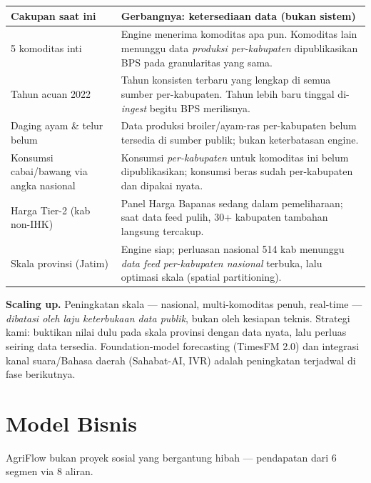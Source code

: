 \documentclass[11pt,a4paper]{article}
\begin{document}
\begin{center}
\begin{longtable}{p{6.2cm}p{8.6cm}}
\toprule
\textbf{Cakupan saat ini} & \textbf{Gerbangnya: ketersediaan data (bukan sistem)} \\
\midrule
\endhead
5 komoditas inti & Engine menerima komoditas apa pun. Komoditas lain menunggu data
\emph{produksi per-kabupaten} dipublikasikan BPS pada granularitas yang sama. \\
Tahun acuan 2022 & Tahun konsisten terbaru yang lengkap di semua sumber per-kabupaten. Tahun
lebih baru tinggal di-\emph{ingest} begitu BPS merilisnya. \\
Daging ayam \& telur belum & Data produksi broiler/ayam-ras per-kabupaten belum tersedia di sumber
publik; bukan keterbatasan engine. \\
Konsumsi cabai/bawang via angka nasional & Konsumsi \emph{per-kabupaten} untuk komoditas ini belum
dipublikasikan; konsumsi beras sudah per-kabupaten dan dipakai nyata. \\
Harga Tier-2 (kab non-IHK) & Panel Harga Bapanas sedang dalam pemeliharaan; saat data feed pulih,
30+ kabupaten tambahan langsung tercakup. \\
Skala provinsi (Jatim) & Engine siap; perluasan nasional 514 kab menunggu \emph{data feed
per-kabupaten nasional} terbuka, lalu optimasi skala (spatial partitioning). \\
\bottomrule
\end{longtable}
\end{center}

\noindent\textbf{Scaling up.} Peningkatan skala --- nasional, multi-komoditas penuh, real-time ---
\emph{dibatasi oleh laju keterbukaan data publik}, bukan oleh kesiapan teknis. Strategi kami:
buktikan nilai dulu pada skala provinsi dengan data nyata, lalu perluas seiring data tersedia.
Foundation-model forecasting (TimesFM 2.0) dan integrasi kanal suara/Bahasa daerah (Sahabat-AI,
IVR) adalah peningkatan terjadwal di fase berikutnya.

\section{Model Bisnis}
AgriFlow bukan proyek sosial yang bergantung hibah --- pendapatan dari 6 segmen via 8 aliran.
\end{document}
